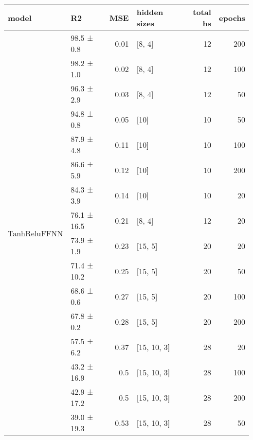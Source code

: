 \begin{longtable}{llrlrr}
\hline
 model                                 & R2          &   MSE & hidden sizes   &   total hs &   epochs \\
\hline
 \hline
\multirow{16}{*}{TanhReluFFNN} & 98.5 ± 0.8  &  0.01 & [8, 4]         &         12 &      200 \\
                                       & 98.2 ± 1.0  &  0.02 & [8, 4]         &         12 &      100 \\
                                       & 96.3 ± 2.9  &  0.03 & [8, 4]         &         12 &       50 \\
                                       & 94.8 ± 0.8  &  0.05 & [10]           &         10 &       50 \\
                                       & 87.9 ± 4.8  &  0.11 & [10]           &         10 &      100 \\
                                       & 86.6 ± 5.9  &  0.12 & [10]           &         10 &      200 \\
                                       & 84.3 ± 3.9  &  0.14 & [10]           &         10 &       20 \\
                                       & 76.1 ± 16.5 &  0.21 & [8, 4]         &         12 &       20 \\
                                       & 73.9 ± 1.9  &  0.23 & [15, 5]        &         20 &       20 \\
                                       & 71.4 ± 10.2 &  0.25 & [15, 5]        &         20 &       50 \\
                                       & 68.6 ± 0.6  &  0.27 & [15, 5]        &         20 &      100 \\
                                       & 67.8 ± 0.2  &  0.28 & [15, 5]        &         20 &      200 \\
                                       & 57.5 ± 6.2  &  0.37 & [15, 10, 3]    &         28 &       20 \\
                                       & 43.2 ± 16.9 &  0.5  & [15, 10, 3]    &         28 &      100 \\
                                       & 42.9 ± 17.2 &  0.5  & [15, 10, 3]    &         28 &      200 \\
                                       & 39.0 ± 19.3 &  0.53 & [15, 10, 3]    &         28 &       50 \\
\hline
\end{longtable}
